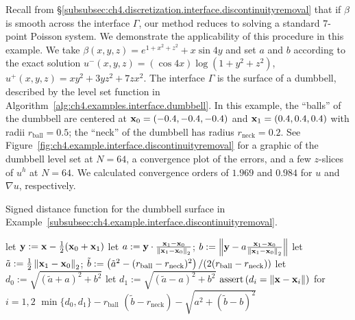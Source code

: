 Recall from \S\ref{subsubsec:ch4.discretization.interface.discontinuityremoval} that if $\beta$ is smooth across the interface $\Gamma$, our method reduces to solving a standard $7$-point Poisson system. We demonstrate the applicability of this procedure in this example. We take $\beta(x,y,z) = e^{1 + x^2 + z^2} + x \sin 4y$ and set $a$ and $b$ according to the exact solution $u^-(x,y,z) = (\cos 4x) \log(1 + y^2 + z^2)$, $u^+(x,y,z) = x y^2 + 3 y z^2 + 7 z x^2$. The interface $\Gamma$ is the surface of a dumbbell, described by the level set function in Algorithm~\ref{alg:ch4.examples.interface.dumbbell}. In this example, the ``balls'' of the dumbbell are centered at $\mathbf{x}_0 = (-0.4,-0.4,-0.4)$ and $\mathbf{x}_1 = (0.4,0.4,0.4)$ with radii $r_{\text{ball}} = 0.5$; the ``neck'' of the dumbbell has radius $r_{\text{neck}} = 0.2$. See Figure~\ref{fig:ch4.example.interface.discontinuityremoval} for a graphic of the dumbbell level set at $N = 64$, a convergence plot of the errors, and a few $z$-slices of $u^h$ at $N = 64$. We calculated convergence orders of $1.969$ and $0.984$ for $u$ and $\nabla u$, respectively.

\begin{algorithm}
\caption{Signed distance function for the dumbbell surface in Example~\ref{subsubsec:ch4.example.interface.discontinuityremoval}.}
\label{alg:ch4.examples.interface.dumbbell}
\begin{algorithmic}
\STATE {}
\STATE {}
\STATE let $\mathbf{y} := \mathbf{x} - \frac{1}{2} (\mathbf{x}_0 + \mathbf{x}_1)$
\STATE {}
\STATE let $a := \mathbf{y} \cdot \frac{\mathbf{x}_1 - \mathbf{x}_0}{\left\lVert \mathbf{x}_1 - \mathbf{x}_0 \right\rVert_2}$; $b := \left\lVert \mathbf{y} - a \frac{\mathbf{x}_1 - \mathbf{x}_0}{\left\lVert \mathbf{x}_1 - \mathbf{x}_0 \right\rVert_2} \right\rVert$
\STATE let $\tilde{a} := \frac{1}{2} \left\lVert \mathbf{x}_1 - \mathbf{x}_0 \right\rVert_2$; $\tilde{b} := \left( \tilde{a}^2 - (r_{\text{ball}} - r_{\text{neck}})^2 \right) / (2 (r_{\text{ball}} - r_{\text{neck}}))$
    \STATE let $d_0 := \sqrt{(\tilde{a} + a)^2 + b^2}$ 
    \STATE let $d_1 := \sqrt{(\tilde{a} - a)^2 + b^2}$ 
    \STATE $\operatorname{assert} \left( d_i = \left\lVert \mathbf{x} - \mathbf{x}_i \right\rVert \right)$ for $i = 1,2$
    \RETURN $\min \{d_0, d_1\} - r_{\text{ball}}$
\ELSE
    \RETURN $(\tilde{b} - r_{\text{neck}}) - \sqrt{a^2 + (\tilde{b} - b)^2}$
\ENDIF
\end{algorithmic}
\end{algorithm}

